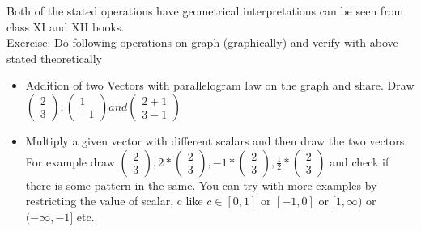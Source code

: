 \documentclass{article}
\begin{document}
Both of the stated operations have geometrical interpretations can be seen from class XI and XII books.\\
Exercise: Do following operations on graph (graphically) and verify with above stated theoretically
\begin{itemize}
    \item Addition of two Vectors with parallelogram law on the graph and share. Draw $\begin{pmatrix}
        2\\3
    \end{pmatrix},
    \begin{pmatrix}
        1\\-1
    \end{pmatrix}
     and \begin{pmatrix}
        2+1\\3-1
    \end{pmatrix}$
    \item Multiply a given vector with different scalars and then draw the two vectors. For example draw $\begin{pmatrix}
        2\\3
    \end{pmatrix},2*\begin{pmatrix}
        2\\3
    \end{pmatrix},
    -1*\begin{pmatrix}
        2\\3
    \end{pmatrix},
    \frac{1}{2}*\begin{pmatrix}
        2\\3
    \end{pmatrix}$ and check if there is some pattern in the same. You can try with more examples by restricting the value of scalar, c like $c\in [0,1]$ or $[-1,0]$ or $[1,\infty)$ or $(-\infty,-1]$ etc.
\end{itemize}
\end{document}
